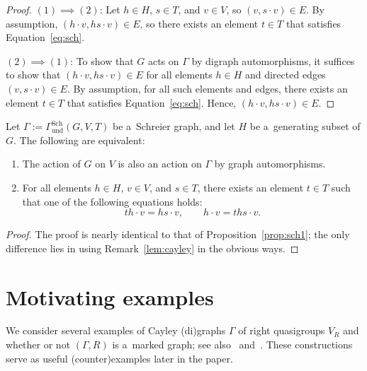 \documentclass{jonasart}
\newcommand{\Sch}{\mathrm{Sch}}
\newcommand{\und}{\mathrm{und}}
\begin{document}
	\begin{proof}
		$(1)\implies(2)$: Let $h\in H$, $s\in T$, and $v\in V$, so $(v,s\cdot v)\in E$. By assumption, $(h\cdot v, hs\cdot v)\in E$, so there exists an element $t\in T$ that satisfies Equation~\eqref{eq:sch}.

		$(2)\implies (1)$:
		To show that $G$ acts on $\Gamma$ by digraph automorphisms, it suffices to show that $(h\cdot v,hs\cdot v)\in E$ for all elements $h\in H$ and directed edges $(v,s\cdot v)\in E$. By assumption, for all such elements and edges, there exists an element $t\in T$ that satisfies Equation~\eqref{eq:sch}. Hence, $(h\cdot v,hs\cdot v)\in E$.
	\end{proof}

	\begin{proposition}\label{prop:sch2}
		Let $\Gamma:=\Gamma_{\und}^{\Sch}(G,V,T)$ be a~Schreier graph, and let $H$ be a~generating subset of $G$. The following are equivalent:
		\begin{enumerate}
			\item The action of $G$ on $V$ is also an action on $\Gamma$ by graph automorphisms.
			\item For all elements $h\in H$, $v\in V$, and $s\in T$, there exists an element $t\in T$ such that one of the following equations holds:
			\begin{equation*}
				th\cdot v=hs\cdot v,\quad\quad h\cdot v=ths\cdot v.
			\end{equation*}
		\end{enumerate}
	\end{proposition}

	\begin{proof}
		The proof is nearly identical to that of Proposition~\ref{prop:sch1}; the only difference lies in using Remark~\ref{lem:cayley} in the obvious ways.
	\end{proof}

	\section{Motivating examples}\label{sec:ex} 
    
    We consider several examples of Cayley (di)graphs $\Gamma$ of right quasigroups $V_R$ and whether or not $(\Gamma,R)$ is a~marked graph; see also~\cite{bardakov} and~\cite[Section~1.15]{textbook}. These constructions serve as useful (counter)examples later in the paper.
\end{document}
